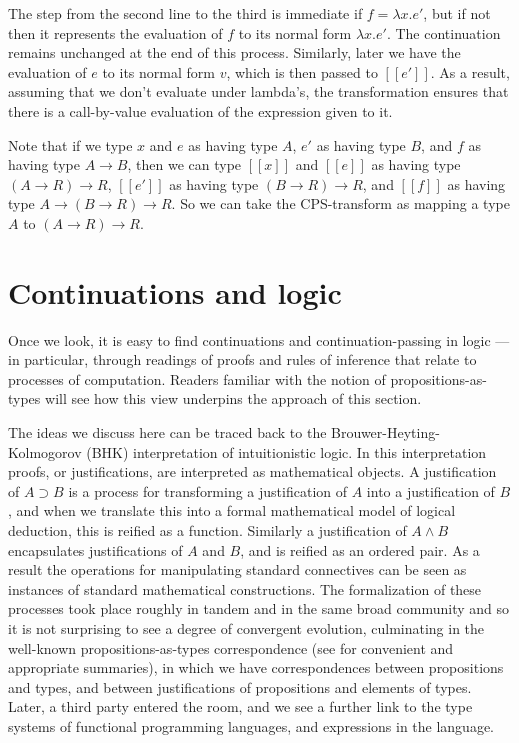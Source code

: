 \documentclass{sn-jnl}
\newcommand{\db}[1]{[\![#1]\!]}
\begin{document}
The step from the second line to the third is immediate if $f=\lambda x.e'$, but if not then it represents the evaluation of $f$ to its normal form $\lambda x.e'$. The continuation remains unchanged at the end of this process. Similarly, later we have the evaluation of $e$ to its normal form $v$, which is then passed to $\db{e'}$. As a result, assuming that we don't evaluate under lambda's, the transformation ensures that there is a call-by-value evaluation of the expression given to it. 

Note that if we type $x$ and $e$ as having type $A$, $e'$ as having type $B$, and $f$ as having type $A\to B$, then we can type $\db{x}$ and $\db{e}$ as having type 
$(A\to R)\to R$, $\db{e'}$ as having type $(B\to R) \to R$, 
and $\db{f}$ as having type $A\to (B\to R)\to R$. So we can take the CPS-transform as mapping a type $A$ to $(A\to R)\to R$.


\section{Continuations and logic}\label{sec:ContinuationsAndLogic}

Once we look, it is easy to find continuations and continuation-passing in logic --- in particular, through readings of proofs and rules of inference that relate to processes of computation. Readers familiar with the notion of propositions-as-types \cite{Howard1980,Girard1989} will see how this view underpins the approach of this section. 

The ideas we discuss here can be traced back to the Brouwer-Heyting-Kolmogorov (BHK) interpretation of intuitionistic logic. In this interpretation proofs, or justifications, are interpreted as mathematical objects. A justification of $A\supset B$ is a process for transforming a justification of $A$ into a justification of $B$, and when we translate this into a formal mathematical model of logical deduction, this is reified as a function. Similarly a justification of $A\wedge B$ encapsulates justifications of $A$ and $B$, and is reified as an ordered pair. As a result the operations for manipulating standard connectives can be seen as instances of standard mathematical constructions. The formalization of these processes took place roughly in tandem and in the same broad community and so it is not surprising to see a degree of convergent evolution, culminating in the well-known 
propositions-as-types correspondence (see \cite{Howard1980,Girard1989} for convenient and appropriate summaries), in which we have correspondences between propositions and types, and between justifications of propositions and elements of types. Later, a third party entered the room, and we see a further link to the type systems of functional programming languages, and expressions in the language.  
\end{document}
